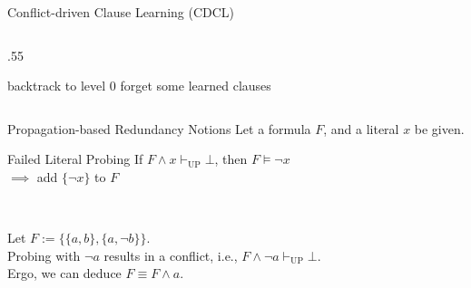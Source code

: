 \documentclass[t]{sdqbeamer}
\begin{document}
\begin{frame}{Conflict-driven Clause Learning (CDCL)}
\begin{columns}[T]
\begin{column}{.55\linewidth}
\begin{algorithm}[H]
     {
        \Return \UNSAT
    }
    \BlankLine
     {
        \propagation\;
         {
             {
                \Return \UNSAT
            }
        }
        \lIf {\restart} {
            backtrack to level $0$
        }
        \lIf {\cleanup} {
            forget some learned clauses
        }
         {
            \Return \UNSAT
        }
        \branching\;
    }
    \Return \SAT\;
\end{algorithm}
\end{column}
\end{columns}
\end{frame}


\begin{frame}{Propagation-based Redundancy Notions}
Let a formula $F$, and a literal $x$ be given.\\[1ex]
\begin{block}{Failed Literal Probing}
If $F \land x \vdash_{\mathop{UP}} \bot$, then $F \models \lnot x$\\[1ex]
$\implies$ add $\{ \lnot x \}$ to $F$
\end{block}~\\
\pause
\begin{example}
Let $F := \bigl\{ \{a, b\}, \{a, \lnot b\} \bigr\}$.\\[1ex]
Probing with $\lnot a$ results in a conflict, i.e., $F \land \lnot a \vdash_{\mathop{UP}} \bot$.\\[1ex]
Ergo, we can deduce $F \equiv F \land a$.
\end{example}
\end{frame}
    
\end{document}
